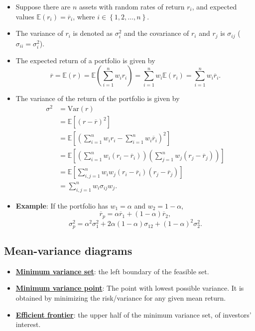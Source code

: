 \documentclass[twocolumn,landscape,10pt]{article}
\theoremstyle{definition}
\begin{document}
\begin{itemize}
    \item Suppose there are $n$ assets with random rates of return $r_i$,
        and expected values $\mathbb{E}(r_i)=\overline{r}_i$,
        where $i\in\left\{1,2,\ldots,n\right\}$.
    \item The variance of $r_i$ is denoted as $\sigma_i^2$ and the covariance of
        $r_i$ and $r_j$ is $\sigma_{ij}$ ($\sigma_{ii}=\sigma_i^2$).
    \item The expected return of a portfolio is given by
        \[
            \overline{r}=\mathbb{E}(r)=\mathbb{E}\left(\sum_{i=1}^{n}w_ir_i\right)
            =\sum_{i=1}^{n}w_i\mathbb{E}(r_i)
            =\sum_{i=1}^{n}w_i \overline{r}_i.
        \]
    \item The variance of the return of the portfolio is given by
        \begin{align*}
            \sigma^2
            &= \text{Var}(r) \\
            &= \mathbb{E}[{(r-\overline{r})}^{2}] \\
            &= \mathbb{E}\left[{\left(\sum_{i=1}^{n}w_ir_i-\sum_{i=1}^{n}w_i
            \overline{r}_i\right)}^{2}\right] \\
            &= \mathbb{E}\left[\left(\sum_{i=1}^{n}w_i(r_i-\overline{r}_i)\right)
            \left(\sum_{j=1}^{n}w_j(r_j-\overline{r}_j)\right)\right] \\
            &= \mathbb{E}\left[\sum_{i,j=1}^{n}w_iw_j(r_i-\overline{r}_i)(r_j-\overline{r}_j)\right] \\
            &= \sum_{i,j=1}^{n}w_i\sigma_{ij}w_j.
        \end{align*}
    \item \textbf{Example}: If the portfolio has $w_1=\alpha$ and
        $w_2=1-\alpha$,
        \[
            \overline{r}_p=\alpha \overline{r}_1+(1-\alpha)\overline{r}_2,
        \]
        \[
            \sigma^2_p=\alpha^2\sigma^2_1+2\alpha(1-\alpha)\sigma_{12}+(1-\alpha)^2\sigma_2^2.
        \]
\end{itemize}

\subsection{Mean-variance diagrams}

\begin{itemize}
    \item \textbf{\underline{Minimum variance set}}: 
        the left boundary of the feasible set.
    \item \textbf{\underline{Minimum variance point}}: The point with lowest
        possible variance. It is obtained by minimizing the risk/variance for
        any given mean return.
    \item \textbf{\underline{Efficient frontier}}: the upper half of the minimum
        variance set, of investors' interest.
\end{itemize}
\end{document}

